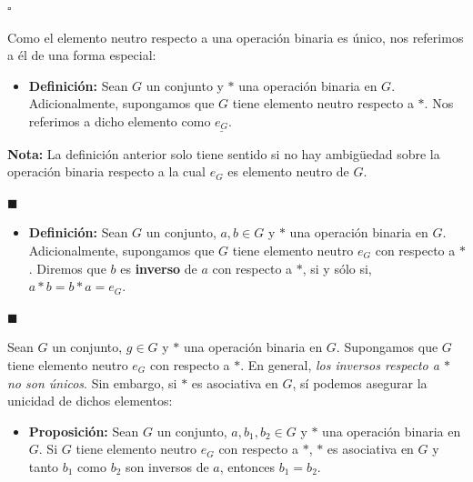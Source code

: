\documentclass[10 pt]{article}
\begin{document}
\begin{flushright}
    $\square$
\end{flushright}

\Large{Como el elemento neutro respecto a una operación binaria es único, nos referimos a él de una forma especial:} \\

\begin{itemize}
    \item \Large{\textbf{Definición:} Sean $G$ un conjunto y $*$ una operación binaria en $G$. Adicionalmente, supongamos que $G$ tiene elemento neutro respecto a $*$. Nos referimos a dicho elemento como $\underline{e_G}$.} \\
\end{itemize}

\Large{\textbf{Nota:} La definición anterior solo tiene sentido si no hay ambigüedad sobre la operación binaria respecto a la cual $e_G$ es elemento neutro de $G$.} \\

\begin{flushright}
    $\blacksquare$
\end{flushright}

\begin{itemize}
    \item \Large{\textbf{Definición:} Sean $G$ un conjunto, $a,b \in G$ y $*$ una operación binaria en $G$. Adicionalmente, supongamos que $G$ tiene elemento neutro $e_G$ con respecto a $*$. Diremos que $b$ es \textbf{inverso} de $a$ con respecto a $*$, si y sólo si, $a*b=b*a=e_G$.} \\
\end{itemize}

\begin{flushright}
    $\blacksquare$
\end{flushright}

\Large{Sean $G$ un conjunto, $g \in G$ y $*$ una operación binaria en $G$. Supongamos que $G$ tiene elemento neutro $e_G$ con respecto a $*$. En general, \textit{los inversos respecto a $*$ no son únicos}. Sin embargo, si $*$ es asociativa en $G$, sí podemos asegurar la unicidad de dichos elementos:} \\

\begin{itemize}
    \item \Large{\textbf{Proposición:} Sean $G$ un conjunto, $a,b_1,b_2 \in G$ y $*$ una operación binaria en $G$. Si $G$ tiene elemento neutro $e_G$ con respecto a $*$, $*$ es asociativa en $G$ y tanto $b_1$ como $b_2$ son inversos de $a$, entonces $b_1=b_2$.} \\
\end{itemize}
\end{document}
